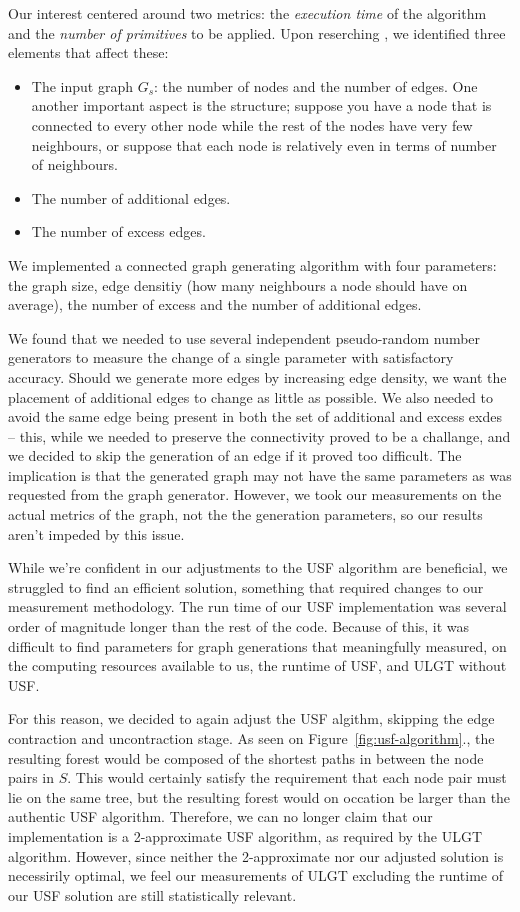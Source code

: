 \documentclass{article}
\begin{document}
Our interest centered around two metrics: the \textit{execution time} of the algorithm and the \textit{number of primitives} to be applied. Upon reserching \cite{ulgt}, we identified three elements that affect these:
\begin{itemize}
  \item The input graph $G_s$: the number of nodes and the number of edges. One another important aspect is the structure; suppose you have a node that is connected to every other node while the rest of the nodes have very few neighbours, or suppose that each node is relatively even in terms of number of neighbours.
  \item The number of additional edges.
  \item The number of excess edges.
\end{itemize}

We implemented a connected graph generating algorithm with four parameters: the graph size, edge densitiy (how many neighbours a node should have on average), the number of excess and the number of additional edges.

We found that we needed to use several independent pseudo-random number generators to measure the change of a single parameter with satisfactory accuracy. Should we generate more edges by increasing edge density, we want the placement of additional edges to change as little as possible. We also needed to avoid the same edge being present in both the set of additional and excess exdes -- this, while we needed to preserve the connectivity proved to be a challange, and we decided to skip the generation of an edge if it proved too difficult. The implication is that the generated graph may not have the same parameters as was requested from the graph generator. However, we took our measurements on the actual metrics of the graph, not the the generation parameters, so our results aren't impeded by this issue.

While we're confident in our adjustments to the USF algorithm are beneficial, we struggled to find an efficient solution, something that required changes to our measurement methodology. The run time of our USF implementation was several order of magnitude longer than the rest of the code. Because of this, it was difficult to find parameters for graph generations that meaningfully measured, on the computing resources available to us, the runtime of USF, and ULGT without USF.

For this reason, we decided to again adjust the USF algithm, skipping the edge contraction and uncontraction stage. As seen on Figure~\ref{fig:usf-algorithm}., the resulting forest would be composed of the shortest paths in between the node pairs in $S$. This would certainly satisfy the requirement that each node pair must lie on the same tree, but the resulting forest would on occation be larger than the authentic USF algorithm. Therefore, we can no longer claim that our implementation is a 2-approximate USF algorithm, as required by the ULGT algorithm. However, since neither the 2-approximate nor our adjusted solution is necessirily optimal, we feel our measurements of ULGT excluding the runtime of our USF solution are still statistically relevant.
\end{document}
